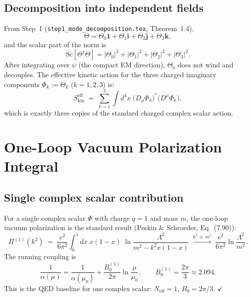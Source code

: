 \documentclass[12pt,a4paper]{article}
\theoremstyle{definition}
\theoremstyle{remark}
\newcommand{\Neff}{N_{\mathrm{eff}}}
\newcommand{\Sc}{\mathrm{Sc}}
\begin{document}
\subsection{Decomposition into independent fields}

From Step~1 (\texttt{step1\_mode\_decomposition.tex}, Theorem~1.4),
\begin{equation}
  \Theta = \Theta_0 \mathbf{1} + \Theta_1 \mathbf{i} + \Theta_2 \mathbf{j} + \Theta_3 \mathbf{k},
  \label{eq:decomp}
\end{equation}
and the scalar part of the norm is
\begin{equation}
  \Sc[\Theta^\dagger \Theta] = |\Theta_0|^2 + |\Theta_1|^2 + |\Theta_2|^2 + |\Theta_3|^2.
  \label{eq:scalar_part}
\end{equation}
After integrating over $\psi$ (the compact EM direction), $\Theta_0$ does not
wind and decouples.  The effective kinetic action for the three charged
imaginary components $\Phi_k := \Theta_k$ ($k=1,2,3$) is:
\begin{equation}
  S_\mathrm{kin}^\mathrm{eff}
  \;=\; \sum_{k=1}^{3} \int d^4x\;
  \bigl(D_\mu\Phi_k\bigr)^*\bigl(D^\mu\Phi_k\bigr),
  \label{eq:S_eff}
\end{equation}
which is exactly three copies of the standard charged complex scalar action.

\section{One-Loop Vacuum Polarization Integral}
\label{sec:vac_pol}

\subsection{Single complex scalar contribution}

For a single complex scalar $\Phi$ with charge $q=1$ and mass $m$, the
one-loop vacuum polarization is the standard result (Peskin \& Schroeder,
Eq.~(7.90)):
\begin{equation}
  \Pi^{(1)}(k^2) \;=\;
  \frac{e^2}{6\pi^2}
  \int_0^1 dx\;x(1-x)\;\ln\!\frac{\Lambda^2}{m^2 - k^2 x(1-x)}
  \;\stackrel{k^2 \ll m^2}{\longrightarrow}\;
  \frac{e^2}{6\pi^2}\ln\frac{\Lambda^2}{m^2}.
  \label{eq:Pi_single}
\end{equation}
The running coupling is
\begin{equation}
  \frac{1}{\alpha(\mu)} = \frac{1}{\alpha(\mu_0)} + \frac{B_0^{(1)}}{2\pi}\ln\frac{\mu}{\mu_0},
  \qquad
  B_0^{(1)} = \frac{2\pi}{3} \approx 2.094.
  \label{eq:running_single}
\end{equation}
This is the QED baseline for one complex scalar: $\Neff = 1$, $B_0 = 2\pi/3$. $\checkmark$
\end{document}
